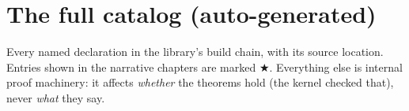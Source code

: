 \setcounter{tocdepth}{1}
\tableofcontents








\appendix


\chapter{The full catalog (auto-generated)}
\label{ch:catalog}
Every named declaration in the library's build chain, with its source
location. Entries shown in the narrative chapters are marked
$\bigstar$. Everything else is internal proof machinery: it affects
\emph{whether} the theorems hold (the kernel checked that), never
\emph{what} they say.



